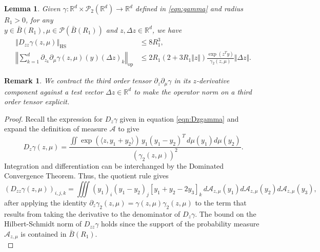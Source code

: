 \documentclass{article}
\newtheorem{lemma}[theorem]{Lemma}
\newtheorem{remark}[theorem]{Remark}
\newcommand{\R}{\mathbb{R}}
\begin{document}
\begin{appendices}
\begin{lemma}\label{lemma:2ndderivatives}
Given $\gamma: \R^d\times \mathcal P_2(\R^d)\to \R^d$ defined in \eqref{eqn:gamma} and radius $R_1>0$, for any\\ $y\in \bar B(R_1), \mu \in\mathcal P(\bar B(R_1))$ and $z,\Delta z\in \R^d$, we have
    \begin{align*}
                \left\Vert D_{zz}\gamma(z,\mu)\right\Vert_{\mathrm{HS}} &\le 8 R_1^3, \\ 
        \left\Vert \sum_{k=1}^d\partial_{z_k}\partial_\mu\gamma(z,\mu)(y)(\Delta z)_k\right\Vert_\mathrm{op}&\le 2R_1(2+3R_1\Vert z\Vert)\frac{\exp(z^Ty)}{\gamma_2(z,\mu)}\Vert \Delta z \Vert.
    \end{align*}
\end{lemma}
\begin{remark}
    We contract the third order tensor $\partial_z\partial_\mu\gamma$ in its $z$-derivative component against a test vector $\Delta z\in \R^d$ to make the operator norm on a third order tensor explicit.
\end{remark}
\begin{proof}
Recall the expression for $D_z\gamma$ given in equation \eqref{eqn:Dzgamma} and expand the definition of measure $\mathcal A$ to give
\begin{equation}\label{eqn:Dzgamma2}
    D_z\gamma(z,\mu) = \frac{\iint \exp(\langle z,y_1+y_2\rangle)\, y_1(y_1-y_2)^T\, d\mu(y_1)d\mu(y_2)}{(\gamma_2(z,\mu))^2}.
\end{equation}
Integration and differentiation can be interchanged by the Dominated Convergence Theorem. Thus, the quotient rule gives
\[
(D_{zz}\gamma(z,\mu))_{i,j,k} =\iiint (y_1)_i(y_1-y_2)_j\left[y_1+y_2 -2y_3\right]_k\,d\mathcal A_{z,\mu}(y_1)d\mathcal A_{z,\mu}(y_2)d\mathcal A_{z,\mu}(y_3),
\]
after applying the identity $\partial_z\gamma_2(z,\mu) = \gamma(z,\mu)\gamma_2(z,\mu)$ 
to the term that results from taking the derivative to the denominator of $D_z\gamma$. The bound on the Hilbert-Schmidt norm of $D_{zz}\gamma$ holds since the support of the probability measure $\mathcal A_{z,\mu}$ is contained in $\bar B(R_1)$.\\


\end{proof}
\end{appendices}
\end{document}
